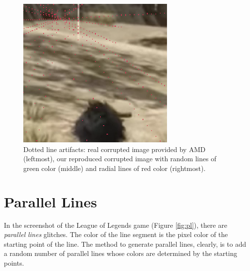 \begin{figure}[!ht]
\includegraphics[scale=.45]{images/dl3.png}
\vspace{5pt}
\caption[Dotted line artifacts]{Dotted line artifacts: real corrupted image provided by AMD (leftmost), our reproduced corrupted image with random lines of green color (middle) and radial lines of red color (rightmost).}
\label{fig:dl}
\end{figure}


\section*{Parallel Lines}
In the screenshot of the League of Legends game (Figure \ref{fig:pl}), there are \textit{parallel lines} glitches. The color of the line segment is the pixel color of the starting point of the line. The method to generate parallel lines, clearly, is to add a random number of parallel lines whose colors are determined by the starting points.

